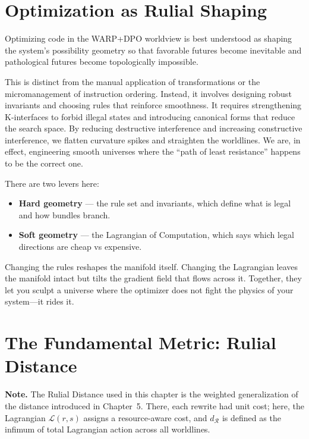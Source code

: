 \section{Optimization as Rulial Shaping}
\label{optimization-as-rulial-shaping}

Optimizing code in the WARP+DPO worldview is best understood as shaping the system's possibility geometry so that favorable futures become inevitable and pathological futures become topologically impossible.

This is distinct from the manual application of transformations or the micromanagement of instruction ordering. Instead, it involves designing robust invariants and choosing rules that reinforce smoothness. It requires strengthening K-interfaces to forbid illegal states and introducing canonical forms that reduce the search space. By reducing destructive interference and increasing constructive interference, we flatten curvature spikes and straighten the worldlines. We are, in effect, engineering smooth universes where the ``path of least resistance'' happens to be the correct one.

There are two levers here:

\begin{itemize}
  \item \textbf{Hard geometry} — the rule set and invariants, which define what is legal and how bundles branch.
  \item \textbf{Soft geometry} — the Lagrangian of Computation, which says which legal directions are cheap vs expensive.
\end{itemize}

Changing the rules reshapes the manifold itself. Changing the Lagrangian leaves the manifold intact but tilts the gradient field that flows across it. Together, they let you sculpt a universe where the optimizer does not fight the physics of your system—it rides it.

\section{The Fundamental Metric: Rulial Distance}
\label{rulial-distance-as-an-optimization-cost-function}

\noindent\textbf{Note.} The Rulial Distance used in this chapter is the weighted generalization of the distance introduced in Chapter~5. There, each rewrite had unit cost; here, the Lagrangian $\mathcal{L}(r,s)$ assigns a resource-aware cost, and $d_{\mathcal{R}}$ is defined as the infimum of total Lagrangian action across all worldlines.

